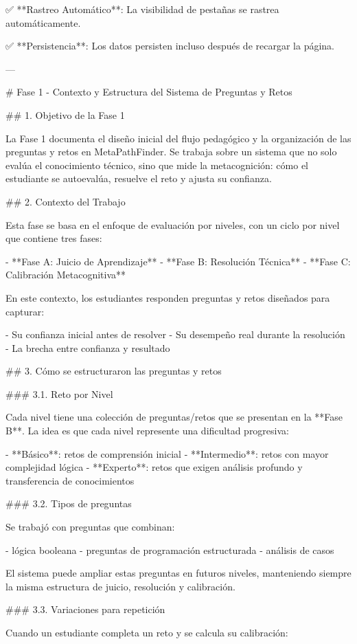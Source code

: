 ✅ **Rastreo Automático**: La visibilidad de pestañas se rastrea automáticamente.

✅ **Persistencia**: Los datos persisten incluso después de recargar la página.

---

# Fase 1 - Contexto y Estructura del Sistema de Preguntas y Retos

## 1. Objetivo de la Fase 1

La Fase 1 documenta el diseño inicial del flujo pedagógico y la organización de las preguntas y retos en MetaPathFinder. Se trabaja sobre un sistema que no solo evalúa el conocimiento técnico, sino que mide la metacognición: cómo el estudiante se autoevalúa, resuelve el reto y ajusta su confianza.

## 2. Contexto del Trabajo

Esta fase se basa en el enfoque de evaluación por niveles, con un ciclo por nivel que contiene tres fases:

- **Fase A: Juicio de Aprendizaje**
- **Fase B: Resolución Técnica**
- **Fase C: Calibración Metacognitiva**

En este contexto, los estudiantes responden preguntas y retos diseñados para capturar:

- Su confianza inicial antes de resolver
- Su desempeño real durante la resolución
- La brecha entre confianza y resultado

## 3. Cómo se estructuraron las preguntas y retos

### 3.1. Reto por Nivel

Cada nivel tiene una colección de preguntas/retos que se presentan en la **Fase B**. La idea es que cada nivel represente una dificultad progresiva:

- **Básico**: retos de comprensión inicial
- **Intermedio**: retos con mayor complejidad lógica
- **Experto**: retos que exigen análisis profundo y transferencia de conocimientos

### 3.2. Tipos de preguntas

Se trabajó con preguntas que combinan:

- lógica booleana
- preguntas de programación estructurada
- análisis de casos

El sistema puede ampliar estas preguntas en futuros niveles, manteniendo siempre la misma estructura de juicio, resolución y calibración.

### 3.3. Variaciones para repetición

Cuando un estudiante completa un reto y se calcula su calibración:

